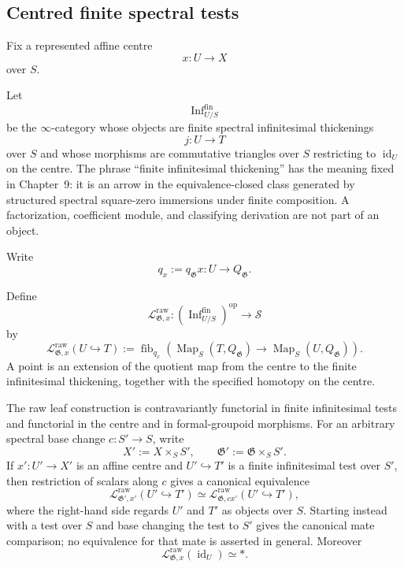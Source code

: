 \subsection{Centred finite spectral tests}

Fix a represented affine centre
\[
    x:U\longrightarrow X
\]
over $S$.

\begin{definition}
\label{def:bnla-centred-inf-tests}
Let
\[
    \operatorname{Inf}^{\mathrm{fin}}_{U/S}
\]
be the $\infty$-category whose objects are finite spectral infinitesimal
thickenings
\[
    j:U\longrightarrow T
\]
over $S$ and whose morphisms are commutative triangles over $S$ restricting
to $\operatorname{id}_U$ on the centre.  The phrase ``finite infinitesimal
thickening'' has the meaning fixed in Chapter~9: it is an arrow in the
equivalence-closed class generated by structured spectral square-zero
immersions under finite composition.  A factorization, coefficient module,
and classifying derivation are not part of an object.
\end{definition}

Write
\[
    q_x:=q_{\mathfrak G}x:U\longrightarrow Q_{\mathfrak G}.
\]

\begin{definition}
\label{def:bnla-raw-formal-leaf}
Define
\[
    \mathcal L^{\mathrm{raw}}_{\mathfrak G,x}:
    \left(\operatorname{Inf}^{\mathrm{fin}}_{U/S}\right)^{\mathrm{op}}
    \longrightarrow\mathcal S
\]
by
\[
\boxed{
    \mathcal L^{\mathrm{raw}}_{\mathfrak G,x}(U\hookrightarrow T)
    :=
    \operatorname{fib}_{q_x}
    \left(
        \operatorname{Map}_S(T,Q_{\mathfrak G})
        \longrightarrow
        \operatorname{Map}_S(U,Q_{\mathfrak G})
    \right).}
\]
A point is an extension of the quotient map from the centre to the finite
infinitesimal thickening, together with the specified homotopy on the centre.
\end{definition}

\begin{proposition}
\label{prop:bnla-raw-leaf-functoriality}
The raw leaf construction is contravariantly functorial in finite
infinitesimal tests and functorial in the centre and in formal-groupoid
morphisms.  For an arbitrary spectral base change $c:S'\to S$, write
\[
    X':=X\times_SS',
    \qquad
    \mathfrak G':=\mathfrak G\times_SS'.
\]
If $x':U'\to X'$ is an affine centre and $U'\hookrightarrow T'$ is a finite
infinitesimal test over $S'$, then restriction of scalars along $c$ gives a
canonical equivalence
\[
\boxed{
    \mathcal L^{\mathrm{raw}}_{\mathfrak G',x'}(U'\hookrightarrow T')
    \simeq
    \mathcal L^{\mathrm{raw}}_{\mathfrak G,cx'}
    (U'\hookrightarrow T'),}
\]
where the right-hand side regards $U'$ and $T'$ as objects over $S$.  Starting
instead with a test over $S$ and base changing the test to $S'$ gives the
canonical mate comparison; no equivalence for that mate is asserted in
general.  Moreover
\[
    \mathcal L^{\mathrm{raw}}_{\mathfrak G,x}(\operatorname{id}_U)
    \simeq *.
\]
\end{proposition}

